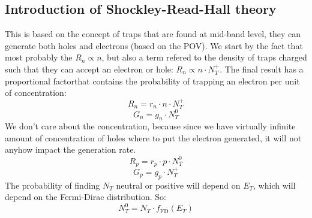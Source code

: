 \subsection{Introduction of Shockley-Read-Hall theory}
This is based on the concept of traps that are found at mid-band level, they can generate both holes and electrons (based on the POV).
We start by the fact that most probably the $R_n \propto n$, but also a term refered to the density of traps charged such that they can accept an electron or hole: $R_n \propto n \cdot N_T^+$. The final result has a proportional factorthat contains the probability of trapping an electron per unit of concentration:
\begin{equation}
    R_n = r_n \cdot n \cdot N_T^+
\end{equation}
\begin{equation}
    G_n = g_n \cdot N_T^0
\end{equation}
We don't care about the concentration, because since we have virtually infinite amount of concentration of holes where to put the electron generated, it will not anyhow impact the generation rate.
\begin{equation}
    R_p = r_p \cdot p \cdot N_T^0
\end{equation}
\begin{equation}
    G_p = g_p \cdot N_T^+
\end{equation}
The probability of finding $N_T$ neutral or positive will depend on $E_T$, which will depend on the Fermi-Dirac distribution. So:
\begin{equation}
    N_T^0 = N_T \cdot f_{\text{FD}}(E_T)
\end{equation}